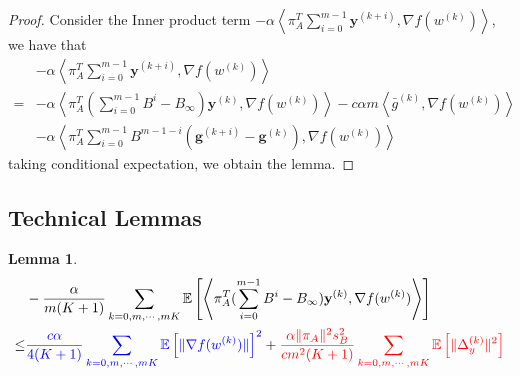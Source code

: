 \documentclass{article}
\newtheorem{lemma}[thm]{Lemma}
\newcommand{\vg}{{\mathbf{g}}}
\newcommand{\vy}{{\mathbf{y}}}
\newcommand{\EE}[1]{\mathbb{E}\left[#1\right]}
\newcommand{\norm}[1]{\| #1 \|}
\newcommand{\ip}[1]{\left\langle#1\right\rangle}
\begin{document}
\begin{proof}
  Consider the Inner product term $-\alpha\ip{\pi_A^T\sum_{i=0}^{m-1}\vy^{(k+i)},\nabla f(w^{(k)})}$, we have that 
\begin{align*}
  &-\alpha\ip{\pi_A^T\sum_{i=0}^{m-1}\vy^{(k+i)},\nabla f(w^{(k)})}\\
  =&-\alpha\ip{\pi_A^T(\sum_{i=0}^{m-1}B^i-B_{\infty}) \vy^{(k)},\nabla f(w^{(k)})}-c\alpha m\ip{\bar{g}^{(k)},\nabla f(w^{(k)})}\\&-\alpha\ip{\pi_A^T\sum_{i=0}^{m-1}B^{m-1-i}(\vg^{(k+i)}-\vg^{(k)}),\nabla f(w^{(k)})}
\end{align*}
taking conditional expectation, we obtain the lemma.
\end{proof}

\subsection{Technical Lemmas}
\begin{lemma}\label{Convergence Analysis: Inner Product Term-1}
  \begin{align*}
    &-\frac{\alpha}{m(K+1)}\sum_{k=0,m,\cdots,mK}\EE{\ip{\pi_A^T(\sum_{i=0}^{m-1}B^i-B_{\infty}) \vy^{(k)},\nabla f(w^{(k)})}}\\ \leq& \textcolor{blue}{\frac{c\alpha}{4(K+1)}\sum_{k=0,m,\cdots,mK}\EE{\norm{\nabla f(w^{(k)})}}^2}+\textcolor{red}{\frac{\alpha\norm{\pi_A}^2s_B^2}{cm^2(K+1)}\sum_{k=0,m,\cdots,mK}\EE{\norm{\Delta_y^{(k)}}^2}}
  \end{align*}
\end{lemma}
\end{document}
